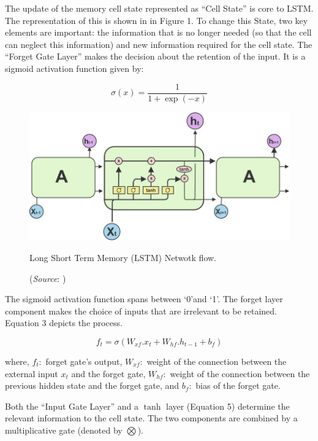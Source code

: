 \documentclass[review]{elsarticle}
\newcommand{\q}[1]{``#1''}
\begin{document}
The update of the memory cell state represented as \q{Cell State} is core to LSTM. The representation of this is shown in in Figure 1. To change this State, two key elements are important: the information that is no longer needed (so that the cell can neglect this information) and new information required for the cell state. The \q{Forget Gate Layer} makes the decision about the retention of the input. It is a sigmoid activation function given by:

\begin{equation}\label{key}
\sigma(x) = \dfrac{1}{1 + \exp(-x)}
\end{equation}


\begin{figure}[h]
\centering
\includegraphics[width=0.7\linewidth]{lstmnetwork}
\caption{Long Short Term Memory (LSTM) Netwotk flow.}
\label{fig:lstmnetwork}
\caption*{(\textit{Source}: \citealp{colah2015})}
\end{figure}

The sigmoid activation function spans between \lq 0\rq \space and \lq 1\rq \space. The forget layer component makes the choice of inputs that are irrelevant to be retained. Equation 3 depicts the process.

\begin{equation}\label{key}
f_{t} = \sigma(W_{xf}.x_{t} + W_{hf}.h_{t-1} + b_{f}) 
\end{equation}

where, \newline
$f_{t}:$ forget gate's output, \newline
$W_{xf}:$ weight of the connection between the external input $x_{t}$ and the forget gate, \newline
$W_{hf}:$ weight of the connection between the previous hidden state and the forget gate, and \newline 
$b_{f}:$ bias of the forget gate.

Both the \q{Input Gate Layer} and a $\tanh$ layer (Equation 5) determine the relevant information to the cell state. The two components are combined by a multiplicative gate (denoted by $\bigotimes$).  
\end{document}
